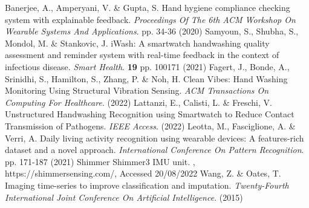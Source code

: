\begin{thebibliography}{99}
    Banerjee, A., Amperyani, V. \& Gupta, S. Hand hygiene compliance checking system with explainable feedback. {\em Proceedings Of The 6th ACM Workshop On Wearable Systems And Applications}. pp. 34-36 (2020)
    Samyoun, S., Shubha, S., Mondol, M. \& Stankovic, J. iWash: A smartwatch handwashing quality assessment and reminder system with real-time feedback in the context of infectious disease. {\em Smart Health}. \textbf{19} pp. 100171 (2021)
    Fagert, J., Bonde, A., Srinidhi, S., Hamilton, S., Zhang, P. \& Noh, H. Clean Vibes: Hand Washing Monitoring Using Structural Vibration Sensing. {\em ACM Transactions On Computing For Healthcare}. (2022)
    Lattanzi, E., Calisti, L. \& Freschi, V. Unstructured Handwashing Recognition using Smartwatch to Reduce Contact Transmission of Pathogens. {\em IEEE Access}. (2022)
    Leotta, M., Fasciglione, A. \& Verri, A. Daily living activity recognition using wearable devices: A features-rich dataset and a novel approach. {\em International Conference On Pattern Recognition}. pp. 171-187 (2021)
    Shimmer Shimmer3 IMU unit. , https://shimmersensing.com/, Accessed 20/08/2022
    Wang, Z. \& Oates, T. Imaging time-series to improve classification and imputation. {\em Twenty-Fourth International Joint Conference On Artificial Intelligence}. (2015)
\end{thebibliography}